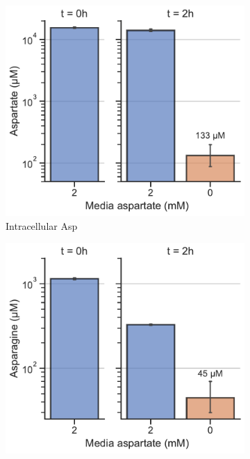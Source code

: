\begin{figure}[!ht]
     \centering
     \begin{subfigure}[b]{0.35\textwidth}
         \includegraphics[width=\textwidth]{figures/sapp/ISR/143B_GOT_DKO_ISR_Asp_conc.pdf}
         \caption{Intracellular Asp}
         \label{fig:sapp:ISR:143B_GOT_DKO_ISR_Asp_conc}
     \end{subfigure}
     \hspace{0.02\textwidth}
     \begin{subfigure}[b]{0.35\textwidth}
         \includegraphics[width=\textwidth]{figures/sapp/ISR/143B_GOT_DKO_ISR_Asn_conc.pdf}

\end{subfigure}
\end{figure}
